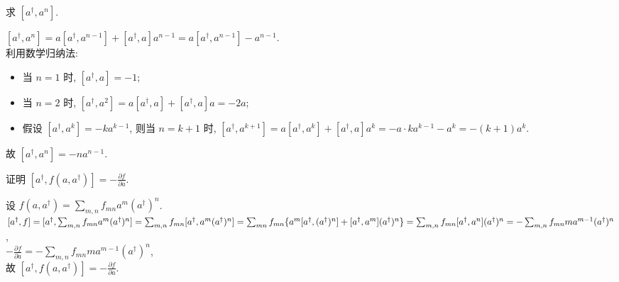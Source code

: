 \documentclass{assignment}
\begin{document}
\begin{prob}
    求 $[a^{\dagger},a^n]$.
\end{prob}
\begin{sol}
    $[a^{\dagger},a^n]=a[a^{\dagger},a^{n-1}]+[a^{\dagger},a]a^{n-1}=a[a^{\dagger},a^{n-1}]-a^{n-1}$.\\
    利用数学归纳法:
    \begin{itemize}
        \item 当 $n=1$ 时, $[a^{\dagger},a]=-1$;
        \item 当 $n=2$ 时, $[a^{\dagger},a^2]=a[a^{\dagger},a]+[a^{\dagger},a]a=-2a$;
        \item 假设 $[a^{\dagger},a^k]=-ka^{k-1}$, 则当 $n=k+1$ 时, $[a^{\dagger},a^{k+1}]=a[a^{\dagger},a^k]+[a^{\dagger},a]a^k=-a\cdot ka^{k-1}-a^k=-(k+1)a^k$.
    \end{itemize}
    故 $[a^{\dagger},a^n]=-na^{n-1}$.
\end{sol}

\begin{prob}
    证明 $[a^{\dagger},f(a,a^{\dagger})]=-\frac{\partial f}{\partial a}$.
\end{prob}
\begin{pf}
    设 $f(a,a^{\dagger})=\sum_{m,n}f_{mn}a^m(a^{\dagger})^n$.\\
    $[a^{\dagger},f]=[a^{\dagger},\sum_{m,n}f_{mn}a^m(a^{\dagger})^n]=\sum_{m,n}f_{mn}[a^{\dagger},a^m(a^{\dagger})^n]=\sum_{mn}f_{mn}\{a^m[a^{\dagger},(a^{\dagger})^n]+[a^{\dagger},a^m](a^{\dagger})^n\}\\=\sum_{m,n}f_{mn}[a^{\dagger},a^n](a^{\dagger})^n=-\sum_{m,n}f_{mn}ma^{m-1}(a^{\dagger})^n$,\\
    $-\frac{\partial f}{\partial a}=-\sum_{m,n}f_{mn}ma^{m-1}(a^{\dagger})^n$,\\
    故 $[a^{\dagger},f(a,a^{\dagger})]=-\frac{\partial f}{\partial a}$.
\end{pf}
\end{document}
